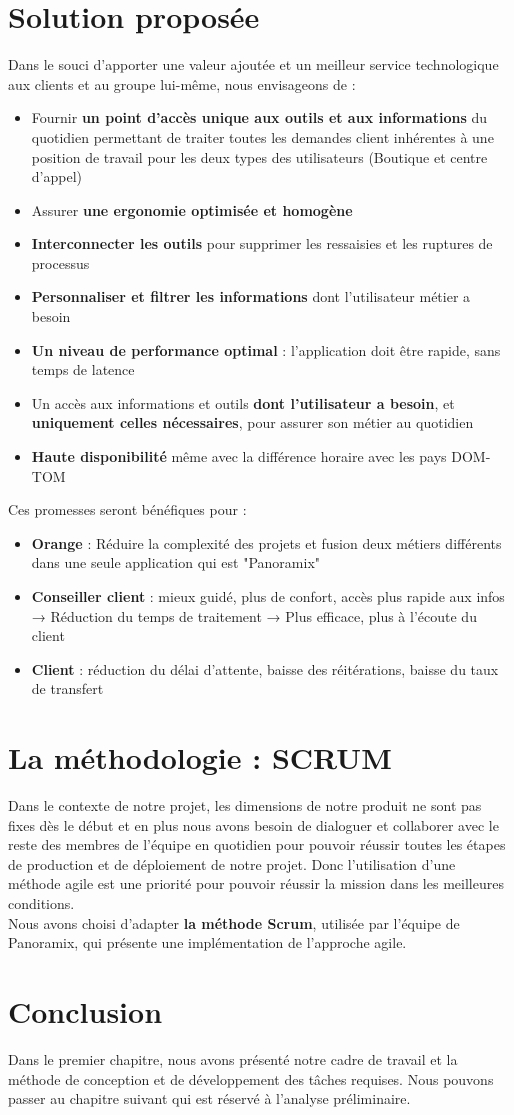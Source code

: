 \section[Solution proposée]{Solution proposée}
Dans le souci d’apporter une valeur ajoutée et un meilleur service technologique aux clients et au groupe lui-même, nous envisageons de :
\begin{itemize}
	\item Fournir \textbf{un point d’accès unique aux outils et aux informations} du quotidien permettant de traiter toutes les demandes client inhérentes à une position de travail pour les deux types des utilisateurs (Boutique et centre d’appel)
	\item Assurer \textbf{une ergonomie optimisée et homogène}
	\item \textbf{Interconnecter les outils} pour supprimer les ressaisies et les ruptures de processus
	\item \textbf{Personnaliser et filtrer les informations} dont l’utilisateur métier a besoin
	\item \textbf{Un niveau de performance optimal} : l’application doit être rapide, sans temps de latence
	\item Un accès aux informations et outils \textbf{dont l’utilisateur a besoin}, et \textbf{uniquement celles nécessaires}, pour assurer son métier au quotidien
	\item \textbf{Haute disponibilité} même avec la différence horaire avec les pays DOM-TOM
\end{itemize}
Ces promesses seront bénéfiques pour :
\begin{itemize}
	\item \textbf{Orange} : Réduire la complexité des projets et fusion deux métiers différents dans une seule application qui est "Panoramix"
	\item \textbf{Conseiller client } : mieux guidé, plus de confort, accès plus rapide aux infos
	\subitem → Réduction du temps  de traitement
	\subitem → Plus efficace, plus à l’écoute du client
	\item \textbf{Client} : réduction du délai d’attente, baisse des réitérations, baisse du taux de transfert
\end{itemize}
\section[La méthodologie : SCRUM]{La méthodologie : SCRUM}
Dans le contexte de notre projet, les dimensions de notre produit ne sont pas fixes dès le début et en plus nous avons besoin de dialoguer  et collaborer avec le reste des membres de l’équipe en quotidien pour pouvoir réussir toutes les étapes de production et de déploiement de notre projet. Donc l’utilisation d’une méthode agile est une priorité pour pouvoir réussir la mission dans les meilleures conditions. 
\\
Nous avons choisi d’adapter \textbf{la méthode Scrum}, utilisée par l’équipe de Panoramix, qui présente une implémentation de l’approche agile.
\section*{Conclusion}
Dans le premier chapitre, nous avons présenté notre cadre de travail et la méthode de conception et de développement des tâches requises. Nous pouvons passer au chapitre suivant qui est réservé à l’analyse préliminaire.